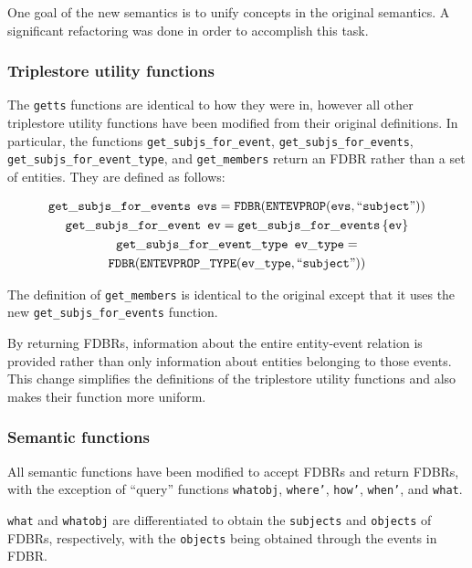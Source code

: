 \documentclass[../main.tex]{subfiles}
\begin{document}
One goal of the new semantics is to unify concepts in the original semantics.  A significant refactoring was done in order to 
accomplish this task.

\subsubsection{Triplestore utility functions}

The \texttt{getts} functions are identical to how they were in\cite{frost2013event}, however
all other triplestore utility functions have been modified from their original definitions.
In particular, the functions \texttt{get\_subjs\_for\_event}, \texttt{get\_subjs\_for\_events},
\texttt{get\_subjs\_for\_event\_type}, and \texttt{get\_members} return an FDBR rather than a set of entities.  They are defined as follows:

\begin{multline*}
  \mathtt{get\_subjs\_for\_events}\enspace \mathtt{evs} = \mathtt{FDBR}(\mathtt{ENTEVPROP}(\mathtt{evs}, \text{``\texttt{subject}''})) \\
  \mathtt{get\_subjs\_for\_event}\enspace \mathtt{ev} = \mathtt{get\_subjs\_for\_events}\left\{\mathtt{ev}\right\} \\
  \mathtt{get\_subjs\_for\_event\_type}\enspace \mathtt{ev\_type} =\\ \mathtt{FDBR}(\mathtt{ENTEVPROP\_TYPE}(\mathtt{ev\_type}, \text{``\texttt{subject}''}))
\end{multline*}

The definition of \texttt{get\_members} is identical to the original except that it uses the new \texttt{get\_subjs\_for\_events} function.

By returning FDBRs, information about the entire entity-event relation is provided rather than only information about entities
belonging to those events.  This change simplifies the definitions of the triplestore utility functions and also makes their function
more uniform.


\subsubsection{Semantic functions}

All semantic functions have been modified to accept FDBRs and return FDBRs, with the exception of ``query'' functions
\texttt{whatobj}, \texttt{where'}, \texttt{how'}, \texttt{when'}, and \texttt{what}.

\texttt{what} and \texttt{whatobj} are differentiated to obtain the \texttt{subjects} and \texttt{objects} of FDBRs, respectively, with the
\texttt{objects} being obtained through the events in FDBR. 
\end{document}
